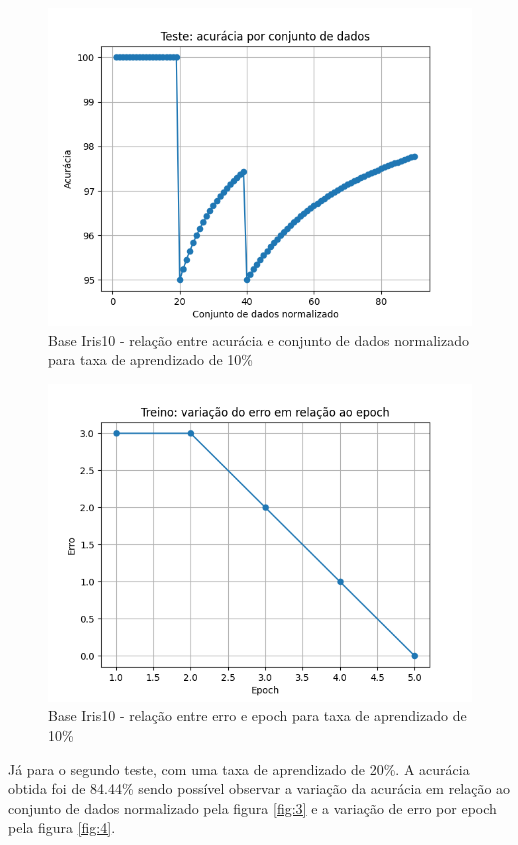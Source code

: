 \documentclass[12pt, %
openright, 
oneside, %
a4paper,    %
brazil]{facom-ufu-abntex2}
\begin{document}
\begin{figure}[H]
\centering
\includegraphics[scale=0.9]{figuras/acuracia1.png}
\caption{Base Iris10 - relação entre acurácia e conjunto de dados normalizado para taxa de aprendizado de 10\%}
\label{fig:1}
\end{figure}

\begin{figure}[H]
\centering
\includegraphics[scale=0.9]{figuras/erro1.png}
\caption{Base Iris10 - relação entre erro e epoch para taxa de aprendizado de 10\%}
\label{fig:2}
\end{figure}

Já para o segundo teste, com uma taxa de aprendizado de 20\%. A acurácia obtida foi de 84.44\% sendo possível observar a variação da acurácia em relação ao conjunto de dados normalizado pela figura \ref{fig:3} e a variação de erro por epoch pela figura \ref{fig:4}.
\end{document}
